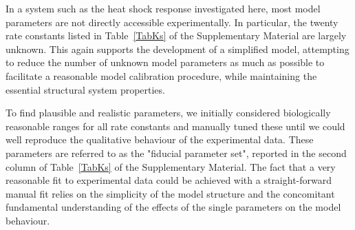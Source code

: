 \documentclass[oneside, 10pt, a4paper, twocolumn]{article}
\begin{document}
In a system such as the heat shock response investigated here, most
model parameters are not directly accessible experimentally. In particular,
the twenty rate constants listed in Table~\ref{TabKs} of the Supplementary Material are largely unknown. This again
supports the development of a simplified model, attempting to reduce the number of unknown 
model parameters as much as possible to facilitate a reasonable model calibration procedure, 
while maintaining the essential structural system properties.


To find plausible and realistic parameters, we initially considered biologically reasonable ranges 
for all rate constants and manually tuned these until we could well reproduce the qualitative behaviour of the experimental data.
These parameters are referred to as the "fiducial parameter set", reported in the second column of Table~\ref{TabKs} of the Supplementary Material.
The fact that a very reasonable fit to experimental data could be achieved with a straight-forward
manual fit relies on the simplicity of the model structure and the concomitant fundamental
understanding of the effects of the single parameters on the model behaviour.
\end{document}

